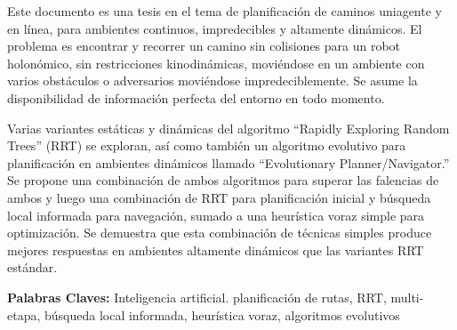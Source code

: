 Este documento es una tesis en el tema de planificaci\'on de caminos uniagente y en
l\'inea, para ambientes continuos, impredecibles y altamente din\'amicos. El problema es encontrar
y recorrer un camino sin colisiones para un robot holon\'omico, sin restricciones kinodin\'amicas,
movi\'endose en un ambiente con varios obst\'aculos o adversarios movi\'endose
impredeciblemente. Se asume la disponibilidad de informaci\'on perfecta del entorno en todo
momento.

Varias variantes est\'aticas y din\'amicas del algoritmo ``Rapidly Exploring Random
Trees'' (RRT)
se exploran, as\'i como tambi\'en un algoritmo evolutivo para planificaci\'on en ambientes
din\'amicos llamado ``Evolutionary Planner/Navigator.'' Se propone una combinaci\'on de ambos
algoritmos para superar las falencias de ambos y luego una combinaci\'on de RRT
para planificaci\'on inicial y b\'usqueda local informada para navegaci\'on, sumado a una 
heur\'istica voraz simple para optimizaci\'on. Se demuestra que esta combinaci\'on de t\'ecnicas 
simples produce mejores respuestas en ambientes altamente din\'amicos que las variantes RRT
est\'andar.

\textbf{Palabras Claves:} Inteligencia artificial. planificaci\'on de rutas,
RRT, multi-etapa, b\'usqueda local informada, heur\'istica voraz, algoritmos
evolutivos
